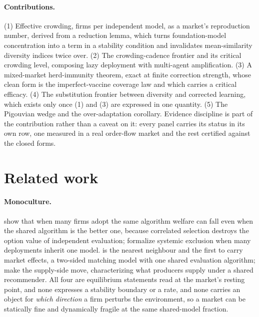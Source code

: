 \documentclass{article}
\theoremstyle{plain}
\theoremstyle{definition}
\begin{document}
\paragraph{Contributions.}
(1) Effective crowding, firms per independent model, as a market's reproduction number, derived from a reduction lemma, which turns foundation-model concentration into a term in a stability condition and invalidates mean-similarity diversity indices twice over. (2) The crowding-cadence frontier and its critical crowding level, composing lazy deployment with multi-agent amplification. (3) A mixed-market herd-immunity theorem, exact at finite correction strength, whose clean form is the imperfect-vaccine coverage law and which carries a critical efficacy. (4) The substitution frontier between diversity and corrected learning, which exists only once (1) and (3) are expressed in one quantity. (5) The Pigouvian wedge and the over-adaptation corollary. Evidence discipline is part of the contribution rather than a caveat on it: every panel carries its status in its own row, one measured in a real order-flow market and the rest certified against the closed forms.

\section{Related work}

\paragraph{Monoculture.}
\citet{kleinberg2021} show that when many firms adopt the same algorithm welfare can fall even when the shared algorithm is the better one, because correlated selection destroys the option value of independent evaluation; \citet{bommasani2022} formalize systemic exclusion when many deployments inherit one model. \citet{peng2024} is the nearest neighbour and the first to carry market effects, a two-sided matching model with one shared evaluation algorithm; \citet{jagadeesan2023} make the supply-side move, characterizing what producers supply under a shared recommender. All four are equilibrium statements read at the market's resting point, and none expresses a stability boundary or a rate, and none carries an object for \emph{which direction} a firm perturbs the environment, so a market can be statically fine and dynamically fragile at the same shared-model fraction.
\end{document}
